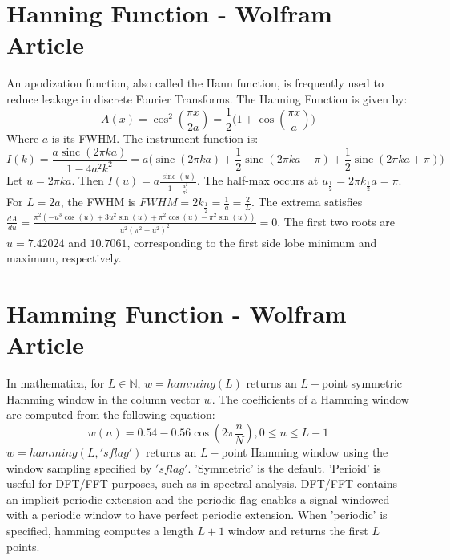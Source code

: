 \documentclass{article}
\theoremstyle{mystyle}
\DeclareMathOperator{\sinc}{sinc}
\begin{document}
\section{Hanning Function - Wolfram Article}
An apodization function, also called the Hann function, is frequently used to reduce leakage in discrete Fourier Transforms. The Hanning Function is given by:
\begin{equation}
A(x) = \cos^{2}(\frac{\pi x}{2a}) = \frac{1}{2}\big(1+\cos(\frac{\pi x}{a})\big)
\end{equation}
\noindent Where $a$ is its FWHM. The instrument function is:
\begin{equation}
I(k) = \frac{a\sinc(2\pi k a)}{1-4a^2 k^2} = a\big(\sinc(2\pi k a)+ \frac{1}{2}\sinc(2\pi k a-\pi)+\frac{1}{2}\sinc(2\pi k a + \pi)\big)
\end{equation}
\noindent Let $u = 2\pi k a$. Then $I(u) = a\frac{\sinc(u)}{1-\frac{u^2}{\pi^2}}$. The half-max occurs at $u_{\frac{1}{2}} = 2\pi k_{\frac{1}{2}}a = \pi$. For $L = 2a$, the FWHM is $FWHM = 2k_{\frac{1}{2}} = \frac{1}{a} = \frac{2}{L}$. The extrema satisfies $\frac{dA}{du} = \frac{\pi^2(-u^3\cos(u)+3u^2\sin(u)+\pi^2\cos(u)-\pi^2\sin(u))}{u^2(\pi^2-u^2)^2} = 0$. The first two roots are $u=7.42024$ and $10.7061$, corresponding to the first side lobe minimum and maximum, respectively. 
\section{Hamming Function - Wolfram Article}
\noindent In mathematica, for $L\in \mathbb{N}$, $w = hamming(L)$ returns an $L-$point symmetric Hamming window in the column vector $w$. The coefficients of a Hamming window are computed from the following equation:
\begin{equation}
w(n) = 0.54-0.56\cos(2\pi \frac{n}{N}), 0\leq n \leq L-1
\end{equation}
\noindent $w=hamming(L,'sflag')$ returns an $L-$point Hamming window using the window sampling specified by $'sflag'$. 'Symmetric' is the default. 'Perioid' is useful for DFT/FFT purposes, such as in spectral analysis. DFT/FFT contains an implicit periodic extension and the periodic flag enables a signal windowed with a periodic window to have perfect periodic extension. When 'periodic' is specified, hamming computes a length $L+1$ window and returns the first $L$ points. 
\end{document}
